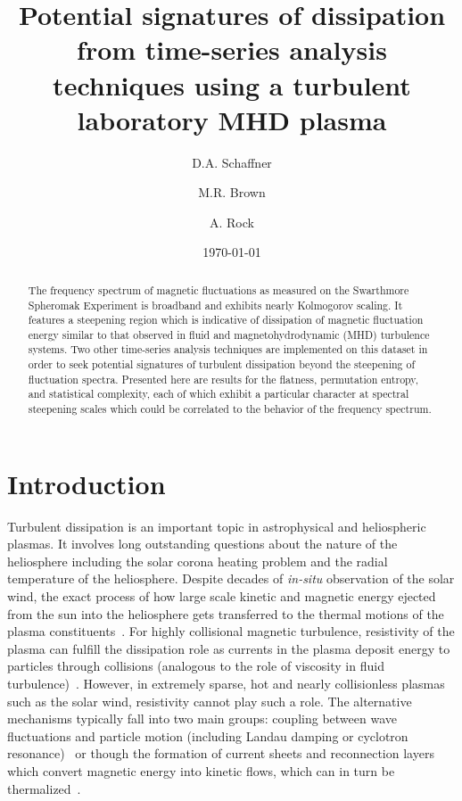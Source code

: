 \documentclass[aip,pop,amsmath,amssymb,preprint,superscriptaddress]{revtex4-1} %
\begin{document}
\title{Potential signatures of dissipation from time-series analysis techniques using a turbulent laboratory MHD plasma}
\author{D.A. Schaffner}
\author{M.R. Brown}
\author{A. Rock}
\date{\today}
\begin{abstract}
The frequency spectrum of magnetic fluctuations as measured on the Swarthmore Spheromak Experiment is broadband and exhibits nearly Kolmogorov scaling. It features a steepening region which is indicative of dissipation of magnetic fluctuation energy similar to that observed in fluid and magnetohydrodynamic (MHD) turbulence systems. Two other time-series analysis techniques are implemented on this dataset in order to seek potential signatures of turbulent dissipation beyond the steepening of fluctuation spectra. Presented here are results for the flatness, permutation entropy, and statistical complexity, each of which exhibit a particular character at spectral steepening scales which could be correlated to the behavior of the frequency spectrum.
\end{abstract}
\maketitle

\section{Introduction}

Turbulent dissipation is an important topic in astrophysical and heliospheric plasmas. It involves long outstanding questions about the nature of the heliosphere including the solar corona heating problem and the radial temperature of the heliosphere. Despite decades of \textit{in-situ} observation of the solar wind, the exact process of how large scale kinetic and magnetic energy ejected from the sun into the heliosphere gets transferred to the thermal motions of the plasma constituents~\cite{kiyani2015}. For highly collisional magnetic turbulence, resistivity of the plasma can fulfill the dissipation role as currents in the plasma deposit energy to particles through collisions (analogous to the role of viscosity in fluid turbulence)~\cite{biskamp2003,zhou2004}. However, in extremely sparse, hot and nearly collisionless plasmas such as the solar wind, resistivity cannot play such a role. The alternative mechanisms typically fall into two main groups: coupling between wave fluctuations and particle motion (including Landau damping or cyclotron resonance)~\cite{sahraoui2009} or though the formation of current sheets and reconnection layers which convert magnetic energy into kinetic flows, which can in turn be thermalized~\cite{osmin2014}.
\end{document}
